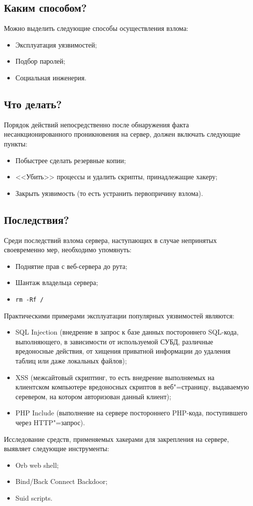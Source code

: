 \documentclass[10pt, a5paper]{article}
\begin{document}
\subsection*{Каким способом?}

Можно выделить следующие способы осуществления взлома:

\begin{itemize}
  \item Эксплуатация уязвимостей;
  \item Подбор паролей;
  \item Социальная инженерия.
\end{itemize}

\subsection*{Что делать?}

Порядок действий непосредственно после обнаружения факта несанкционированного проникновения на сервер, должен включать следующие пункты:

\begin{itemize}
  \item Побыстрее сделать резервные копии;
  \item <<Убить>> процессы и удалить скрипты, принадлежащие хакеру;
  \item Закрыть уязвимость (то есть устранить первопричину взлома).
\end{itemize}

\subsection*{Последствия?}

Среди последствий взлома сервера, наступающих в случае непринятых своевременно мер, необходимо упомянуть:

\begin{itemize}
  \item Поднятие прав с веб-сервера до рута;
  \item Шантаж владельца сервера;
  \item \verb!rm -Rf /!
\end{itemize}

Практическими примерами эксплуатации популярных уязвимостей являются:

\begin{itemize}
  \item SQL Injection (внедрение в запрос к базе данных постороннего SQL-кода, выполняющего, в зависимости от используемой СУБД, различные вредоносные действия, от хищения приватной информации до удаления таблиц или даже локальных файлов);
  \item XSS (межсайтовый скриптинг, то есть внедрение выполняемых на клиентском компьютере вредоносных скриптов в веб"=страницу, выдаваемую серевером, на котором авторизован данный клиент);
  \item PHP Include (выполнение на сервере постороннего PHP-кода, поступившего через HTTP"=запрос).
\end{itemize}

Исследование средств, применяемых хакерами для закрепления на сервере, выявляет следующие инструменты:

\begin{itemize}
  \item Orb web shell;
  \item Bind/Back Connect Backdoor;
  \item Suid scripts.
\end{itemize}
\end{document}
